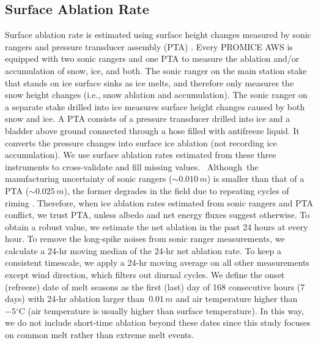 \documentclass[draft]{agujournal2019}
\begin{document}
\subsection{Surface Ablation Rate}
Surface ablation rate is estimated using 
surface height changes measured 
by sonic rangers and pressure transducer assembly (PTA) \cite{Fausto2012a}.
Every PROMICE AWS is equipped with two sonic rangers 
and one PTA to measure the ablation and/or accumulation of 
snow, ice, and both. 
The sonic ranger on the main station stake that 
stands on ice surface sinks as ice melts, 
and therefore only measures the snow height changes 
(i.e., snow ablation and accumulation). 
The sonic ranger on a separate stake 
drilled into ice measures surface height changes caused by 
both snow and ice. 
A PTA consists of a pressure transducer drilled into 
ice and a bladder above ground connected through 
a hose filled with antifreeze liquid. 
It converts the pressure changes into surface ice ablation 
(not recording ice accumulation). 
We use surface ablation rates estimated from 
these three instruments to cross-validate and fill missing values. 
Although the manufacturing uncertainty of sonic rangers 
($\sim 0.010\,m$) is smaller than that of a PTA 
($\sim 0.025\,m$), 
the former degrades in the field 
due to repeating cycles of riming \cite{Fausto2012a}. 
Therefore, when ice ablation rates estimated from 
sonic rangers and PTA conflict, 
we trust PTA, 
unless albedo and net energy fluxes suggest otherwise. 
To obtain a robust value, 
we estimate the net ablation in the past 24 hours at every hour. 
To remove the long-spike noises from 
sonic ranger measurements, 
we calculate a 24-hr moving median of the 24-hr net ablation rate. 
To keep a consistent timescale, 
we apply a 24-hr moving average on 
all other measurements except wind direction, 
which filters out diurnal cycles. 
We define the onset (refreeze) date of melt seasons 
as the first (last) day of 168 consecutive hours (7 days) 
with 24-hr ablation larger than $0.01\, m$
and air temperature higher than $-5\mathrm{^{\circ}C}$
(air temperature is usually higher than surface temperature). 
In this way, we do not include short-time ablation 
beyond these dates since this study 
focuses on common melt rather than extreme melt events. 
\end{document}
